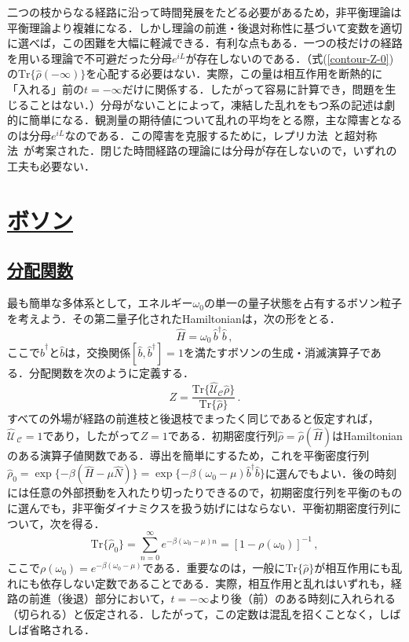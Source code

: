 \documentclass[a4paper,11pt]{ltjsarticle}
\newcommand{\sectionlink}[1]{\section[#1]{\hyperlink{toc}{#1}}}
\newcommand{\subsectionlink}[1]{\subsection[#1]{\hyperlink{toc}{#1}}}
\def\Tr{\mathrm{Tr}}
\begin{document}
二つの枝からなる経路に沿って時間発展をたどる必要があるため，非平衡理論は平衡理論より複雑になる．しかし理論の前進・後退対称性に基づいて変数を適切に選べば，この困難を大幅に軽減できる．有利な点もある．一つの枝だけの経路を用いる理論で不可避だった分母$e^{iL}$が存在しないのである．（式(\ref{contour-Z-0})の$\Tr\{\hat\rho(-\infty)\} $を心配する必要はない．実際，この量は相互作用を断熱的に「入れる」前の$t=-\infty$だけに関係する．したがって容易に計算でき，問題を生じることはない．）分母がないことによって，凍結した乱れをもつ系の記述は劇的に簡単になる．観測量の期待値について乱れの平均をとる際，主な障害となるのは分母$e^{iL}$なのである．この障害を克服するために，レプリカ法~\cite{Edwards,Wegner,EfetovLarkinKhmelnitskii}と超対称法~\cite{Efetov,Efetov-book}が考案された．閉じた時間経路の理論には分母が存在しないので，いずれの工夫も必要ない．


\sectionlink{ボソン}\label{sec_bosons}
\subsectionlink{分配関数}\label{sec_bosons-1}


最も簡単な多体系として，エネルギー$\omega_0$の単一の量子状態を占有するボソン粒子を考えよう．その第二量子化されたHamiltonianは，次の形をとる．
\begin{equation}\label{boson-H}
\hat{H} = \omega_0\, \hat{b}^{\dagger} \hat{b}\, ,
\end{equation}ここで$\hat{b}^{\dagger}$と$\hat{b}$は，交換関係$[\hat{b},\hat{b}^{\dagger}]=1$を満たすボソンの生成・消滅演算子である．分配関数を次のように定義する．
\begin{equation}\label{boson-Z}
Z=\frac{\Tr\big\{\hat{\mathcal{U}}_{\mathcal{C}}\hat{\rho}\big\}}{\Tr\{\hat{\rho}\}}\,.
\end{equation}すべての外場が経路の前進枝と後退枝でまったく同じであると仮定すれば，$\hat{\mathcal{U}}_{\ \mathcal{C}}=1$であり，したがって$Z=1$である．初期密度行列$\hat{\rho}=\hat{\rho}(\hat{H})$はHamiltonianのある演算子値関数である．導出を簡単にするため，これを平衡密度行列$\hat{\rho}_0 = \exp\{-\beta(\hat{H}-\mu\hat
{N})\}=\exp\{-\beta(\omega_0-\mu)\hat{b}^\dagger\hat{b}\}$に選んでもよい．後の時刻には任意の外部摂動を入れたり切ったりできるので，初期密度行列を平衡のものに選んでも，非平衡ダイナミクスを扱う妨げにはならない．平衡初期密度行列について，次を得る．
\begin{equation}\label{boson-density-trace}
\Tr\{\hat{\rho}_0\}=\sum\limits_{n=0}^\infty
e^{-\beta(\omega_0-\mu)n}= [1-\rho(\omega_0)]^{-1}\, ,
\end{equation}ここで$\rho(\omega_0)=e^{-\beta(\omega_0-\mu)}$である．重要なのは，一般に$\Tr\{\hat{\rho}\}$が相互作用にも乱れにも依存しない定数であることである．実際，相互作用と乱れはいずれも，経路の前進（後退）部分において，$t=-\infty$より後（前）のある時刻に入れられる（切られる）と仮定される．したがって，この定数は混乱を招くことなく，しばしば省略される．
\end{document}
